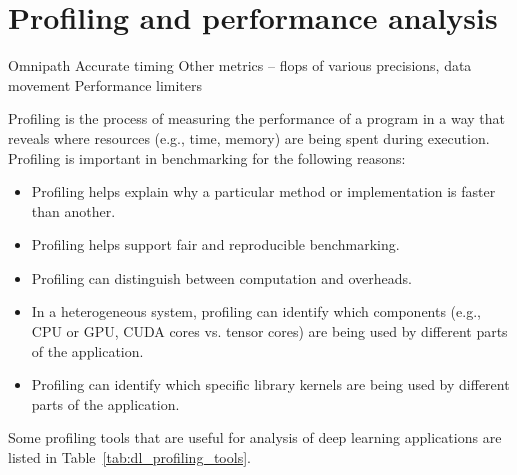 \section{Profiling and performance analysis}
\label{sec:prof}

Omnipath
Accurate timing
Other metrics – flops of various precisions, data movement
Performance limiters

Profiling is the process of measuring the performance of a program in a way that reveals where resources (e.g., time, memory) are being spent during execution. Profiling is important in benchmarking for the following reasons:

\begin{itemize}
    \item Profiling helps explain why a particular method or implementation is faster than another.
    \item Profiling helps support fair and reproducible benchmarking.
    \item Profiling can distinguish between computation and overheads.
    \item In a heterogeneous system, profiling can identify which components (e.g., CPU or GPU, CUDA cores vs. tensor cores) are being used by different parts of the application.
    \item Profiling can identify which specific library kernels are being used by different parts of the application.
\end{itemize}

Some profiling tools that are useful for analysis of deep learning applications are listed in Table~\ref{tab:dl_profiling_tools}.

